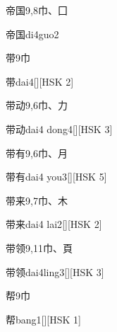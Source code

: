 \begin{entry}{帝国}{9,8}{⼱、⼞}
  \begin{phonetics}{帝国}{di4guo2}
  \end{phonetics}
\end{entry}

\begin{entry}{带}{9}{⼱}
  \begin{phonetics}{带}{dai4}[][HSK 2]
  \end{phonetics}
\end{entry}

\begin{entry}{带动}{9,6}{⼱、⼒}
  \begin{phonetics}{带动}{dai4 dong4}[][HSK 3]
  \end{phonetics}
\end{entry}

\begin{entry}{带有}{9,6}{⼱、⽉}
  \begin{phonetics}{带有}{dai4 you3}[][HSK 5]
  \end{phonetics}
\end{entry}

\begin{entry}{带来}{9,7}{⼱、⽊}
  \begin{phonetics}{带来}{dai4 lai2}[][HSK 2]
  \end{phonetics}
\end{entry}

\begin{entry}{带领}{9,11}{⼱、⾴}
  \begin{phonetics}{带领}{dai4ling3}[][HSK 3]
  \end{phonetics}
\end{entry}

\begin{entry}{帮}{9}{⼱}
  \begin{phonetics}{帮}{bang1}[][HSK 1]
  \end{phonetics}
\end{entry}

